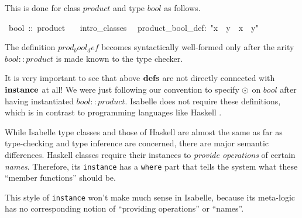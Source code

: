 \begin{isabelle}
\begin{isamarkuptext}
 This is done for class $product$ and type $bool$ as follows.%
\end{isamarkuptext}%
~bool~::~product\isanewline
~~~intro\_classes\isanewline
{}\isanewline
~~product\_bool\_def:~{"}x~{\isasymotimes}~y~{\isasymequiv}~x~{\isasymand}~y{"}%
\begin{isamarkuptext}%
The definition $prod_bool_def$ becomes syntactically well-formed only
 after the arity $bool :: product$ is made known to the type checker.

 \medskip It is very important to see that above ${\mathord{\mathbf{defs}}}$ are not
 directly connected with ${\mathord{\mathbf{instance}}}$ at all!  We were
 just following our convention to specify $\odot$ on $bool$ after
 having instantiated $bool :: product$.  Isabelle does not require
 these definitions, which is in contrast to programming languages like
 Haskell \cite{haskell-report}.

 \medskip While Isabelle type classes and those of Haskell are almost
 the same as far as type-checking and type inference are concerned,
 there are major semantic differences.  Haskell classes require their
 instances to \emph{provide operations} of certain \emph{names}.
 Therefore, its \texttt{instance} has a \texttt{where} part that tells
 the system what these ``member functions'' should be.

 This style of \texttt{instance} won't make much sense in Isabelle,
 because its meta-logic has no corresponding notion of ``providing
 operations'' or ``names''.%
\end{isamarkuptext}%
\end{isabelle}%
